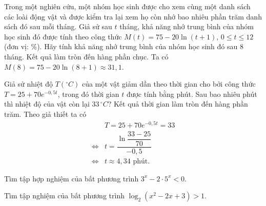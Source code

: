 \begin{bt}%

	Trong một nghiên cứu, một nhóm học sinh được cho xem cùng một danh sách các loài động vật và được kiểm tra lại xem họ còn nhớ bao nhiêu phần trăm danh sách đó sau mỗi tháng. Giả sử sau $t$ tháng, khả năng nhớ trung bình của nhóm học sinh đó được tính theo công thức $M(t) = 75 - 20\ln(t+1)$, $0 \le t \le 12$ (đơn vị: \%). Hãy tính khả năng nhớ trung bình của nhóm học sinh đó sau $8$ tháng. Kết quả làm tròn đến hàng phần chục.
	\loigiai
	{
		Ta có $M(8) = 75 - 20\ln(8+1) \approx 31{,}1$.
	}
\end{bt}

\begin{bt}%

	Giả sử nhiệt độ $T({}^\circ C)$ của một vật giảm dần theo thời gian cho bởi công thức $T = 25 + 70e^{-0{,}5t}$, trong đó thời gian $t$ được tính bằng phút. Sau bao nhiêu phút thì nhiệt độ của vật còn lại $33\, {}^\circ C$? Kết quả thời gian làm tròn đến hàng phần trăm.
\loigiai
	{
		Theo giả thiết ta có
		\begin{align*}
			&T = 25 + 70e^{-0{,}5t} = 33\\
			\Leftrightarrow &t = \dfrac{\ln\dfrac{33-25}{70}}{-0{,}5}\\
			\Leftrightarrow &t \approx 4{,}34 \text{ phút}.
		\end{align*}
	}
\end{bt}

\begin{bt}%

	Tìm tập hợp nghiệm của bất phương trình $3^x-2\cdot5^x<0$.
\end{bt}

\begin{bt}%

	Tìm tập nghiệm của bất phương trình $\log_2\left(x^2-2x+3\right)>1$.
\end{bt}

